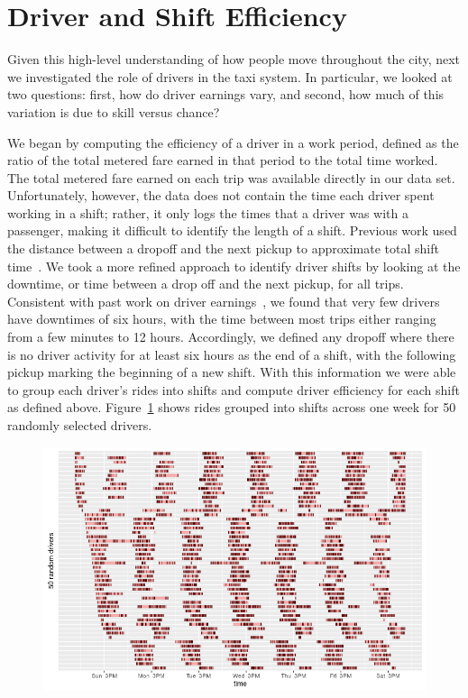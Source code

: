 \documentclass[twocolumn]{article}
\begin{document}
\section{Driver and Shift Efficiency}
Given this high-level understanding of how people move throughout the city, next we investigated the role of drivers in the taxi system. In particular, we looked at two questions: first, how do driver earnings vary, and second, how much of this variation is due to skill versus chance?

We began by computing the efficiency of a driver in a work period, defined as the ratio of the total metered fare earned in that period to the total time worked. The total metered fare earned on each trip was available directly in our data set. Unfortunately, however, the data does not contain the time each driver spent working in a shift; rather, it only logs the times that a driver was with a passenger, making it difficult to identify the length of a shift. Previous work used the distance between a dropoff and the next pickup to approximate total shift time~\cite{LEE:2015}. We took a more refined approach to identify driver shifts by looking at the downtime, or time between a drop off and the next pickup, for all trips.
Consistent with past work on driver earnings~\cite{Farber:2014}, we found that very few drivers have downtimes of six hours, with the time between most trips either ranging from a few minutes to 12 hours. %
Accordingly, we defined any dropoff where there is no driver activity for at least six hours as the end of a shift, with the following pickup marking the beginning of a new shift.
With this information we were able to group each driver's rides into shifts and compute driver efficiency for each shift as defined above. Figure~\ref{fig:shifts_id} shows rides grouped into shifts across one week for 50 randomly selected drivers.
\begin{figure}[t]
  \centering
  \includegraphics[width=1\linewidth]{shifts_id}
  \label{fig:shifts_id}
\end{figure}
\end{document}
